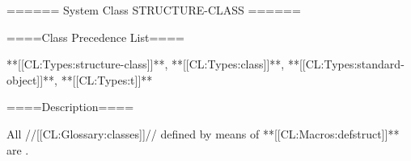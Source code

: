 ====== System Class STRUCTURE-CLASS ======

====Class Precedence List====

**[[CL:Types:structure-class]]**, **[[CL:Types:class]]**, **[[CL:Types:standard-object]]**, **[[CL:Types:t]]**

====Description====

All //[[CL:Glossary:classes]]// defined by means of **[[CL:Macros:defstruct]]** are .

